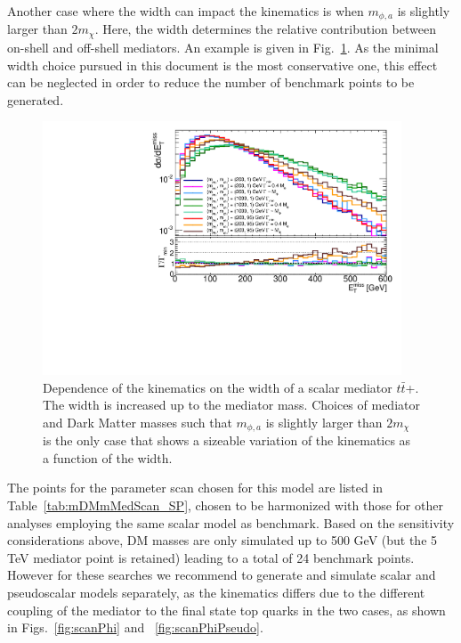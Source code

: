 Another case where the width can impact the kinematics is when $m_{\phi,a}$ is slightly larger than $2m_\chi$. Here, the width determines the relative contribution between on-shell and off-shell mediators. An example is given in Fig.~\ref{fig:widthlargescan}. As the minimal width choice pursued in this document is the most conservative one, this effect can be neglected in order to reduce the number of benchmark points to be generated. 


\begin{figure}[!ht]
  \begin{center}
    \includegraphics[width=0.95\textwidth]{figures/ttbar/ScalarWidth.pdf}
    \vspace{2mm}
    \caption{\label{fig:widthlargescan} Dependence of the kinematics on the width of a scalar mediator $t\bar{t}$+\MET{}. The width is increased up to the mediator mass. Choices of mediator and Dark Matter masses such that $m_{\phi,a}$ is slightly larger than $2m_\chi$ is the only case that shows a sizeable variation of the kinematics as a function of the width.  
    }
\end{center}
\end{figure}

The points for the parameter scan chosen for this model are listed in Table~\ref{tab:mDMmMedScan_SP}, chosen
to be harmonized with those for other analyses employing the same scalar model as benchmark. 
Based on the sensitivity considerations above, DM masses are only simulated up to 500 GeV (but the 5 TeV mediator point is retained)
leading to a total of 24 benchmark points. However for these searches we recommend to generate and simulate scalar and pseudoscalar
models separately, as the kinematics differs due to the different coupling of the mediator to the final state top quarks in the two cases,
as shown in Figs.~\ref{fig:scanPhi} and ~\ref{fig:scanPhiPseudo}.

